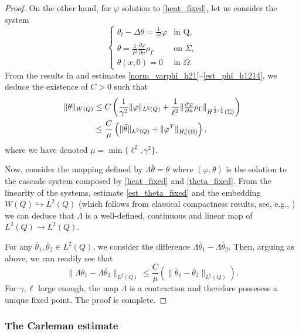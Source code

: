 \documentclass{dcds-bOF}
\theoremstyle{definition}
\def\csbd{\rho_{\Gamma}}
\begin{document}
\begin{proof}
On the other hand, for $\varphi$ solution to \eqref{heat_fixed}, let us consider the system
%
\begin{equation}\label{theta_fixed}
\begin{cases}
\theta_t-\Delta \theta=\frac{1}{\gamma^2}\varphi & \text{in Q}, \\
\theta=\frac{1}{\ell^2}\frac{\partial \varphi}{\partial n}\csbd &\text{on } \Sigma, \\
\theta(x,0)=0 & \text{in } \Omega.
\end{cases}
\end{equation}
%
From the results in \cite[Ch. 4, \S15.5]{lions_magenes} and estimates \eqref{norm_varphi_h21}--\eqref{est_phi_h1214}, we deduce the existence of $C>0$ such that
%
\begin{align}\notag
\|\theta\|_{W(Q)}&\leq C\left(\frac{1}{\gamma^2}\|\varphi\|_{L^2(Q)}+\frac{1}{\ell^2}\|\tfrac{\partial \varphi}{\partial n}\csbd \|_{H^{\frac12,\frac14}(\Sigma)}\right) \\ \label{est_theta_fixed}
&\leq \frac{C}{\mu}\left(\|\bar\theta\|_{L^2(Q)}+\|\varphi^T\|_{H^{1}_0(\Omega)}\right),
\end{align}
%
where we have denoted $\mu=\min\{\ell^2,\gamma^2\}$.

Now, consider the mapping defined by $\Lambda\bar\theta=\theta$ where $(\varphi,\theta)$ is the solution to the cascade system composed by \eqref{heat_fixed} and \eqref{theta_fixed}. From the linearity of the systems, estimate \eqref{est_theta_fixed} and the embedding $W(Q)\hookrightarrow L^2(Q)$ (which follows from classical compactness results, see, e.g., \cite{simon}) we can deduce that $\Lambda$ is a well-defined, continuous and linear map of $L^2(Q)\to L^2(Q)$.

For any $\bar\theta_1,\bar\theta_2\in L^2(Q)$, we consider the difference $\Lambda\bar\theta_1-\Lambda\bar\theta_2$. Then, arguing as above, we can readily see that
%
\begin{equation*}
\|\Lambda \bar\theta_1-\Lambda \bar\theta_2\|_{L^2(Q)}\leq \frac{C}{\mu}\left(\|\bar\theta_1-\bar\theta_2\|_{L^2(Q)}\right).
\end{equation*}
%
For $\gamma,\ell$ large enough, the map $\Lambda$ is a contraction and therefore possesess a unique fixed point. The proof is complete.
\end{proof}

\subsubsection*{The Carleman estimate}
\end{document}
